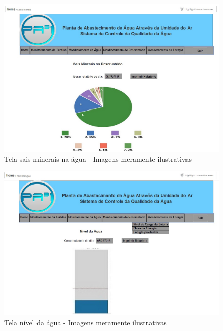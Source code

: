 \begin{center}
\begin{figure}[!ht]
\centering
\includegraphics[scale=0.5]{figuras/11}
\caption[Tela sais minerais na água]{Tela sais minerais na água - Imagens meramente ilustrativas}
\label{tela_sais_minerais_na_agua}
\end{figure}
\clearpage

\begin{figure}[!ht]
\centering
\includegraphics[scale=0.5]{figuras/12}
\caption[Tela nível da água]{Tela nível da água - Imagens meramente ilustrativas}
\label{tela_nivel_da_agua}
\end{figure}
\clearpage


\end{center}
